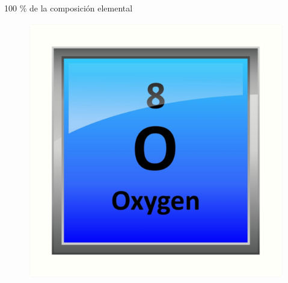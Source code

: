 \documentclass[9pt]{beamer}
\begin{document}
\begin{frame}{100 \% de la composición elemental}
\begin{figure}
		\includegraphics[height=0.15\textheight]{Imagenes/Oxigeno.png}
	\end{figure}
\end{frame}
\end{document}
